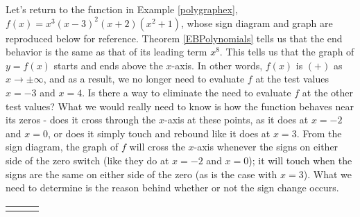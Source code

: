 \medskip


Let's return to the function in Example \ref{polygraphex}, $f(x) = x^3 (x-3)^2 (x+2)\left(x^2+1\right)$, whose sign diagram and graph are reproduced below for reference.  Theorem \ref{EBPolynomials} tells us that the end behavior is the same as that of its leading term $x^{8}$.  This tells us that the graph of $y=f(x)$ starts and ends above the $x$-axis.  In other words, $f(x)$ is $(+)$ as $x \rightarrow \pm \infty$, and as a result, we no longer need to evaluate $f$ at the test values $x=-3$ and $x=4$.  Is there a way to eliminate the need to evaluate $f$ at the other test values?  What we would really need to know is how the function behaves near its zeros - does it cross through the $x$-axis at these points, as it does at $x=-2$ and $x=0$, or does it simply touch and rebound like it does at $x=3$.  From the sign diagram, the graph of $f$ will cross the $x$-axis whenever the signs on either side of the zero switch (like they do at $x=-2$ and $x=0$);  it will touch when the signs are the same on either side of the zero (as is the case with $x=3$). What we need to determine is the reason behind whether or not the sign change occurs.

\begin{tabular}{m{0.5in}m{2.5in}m{2.5in}}

&


 

&


 

\end{tabular}










